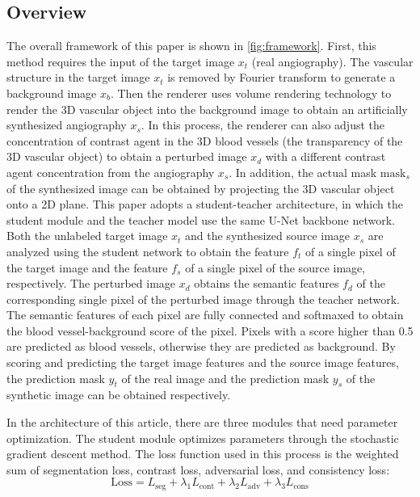 \subsection{Overview}

The overall framework of this paper is shown in \cref{fig:framework}. First, this method requires the input of the target image $x_t$ (real angiography). The vascular structure in the target image $x_t$ is removed by Fourier transform to generate a background image $x_b$. Then the renderer uses volume rendering technology to render the 3D vascular object into the background image to obtain an artificially synthesized angiography $x_s$. In this process, the renderer can also adjust the concentration of contrast agent in the 3D blood vessels (the transparency of the 3D vascular object) to obtain a perturbed image $x_d$ with a different contrast agent concentration from the angiography $x_s$. In addition, the actual mask $\text{mask}_s$ of the synthesized image can be obtained by projecting the 3D vascular object onto a 2D plane. This paper adopts a student-teacher architecture, in which the student module and the teacher model use the same U-Net backbone network. Both the unlabeled target image $x_t$ and the synthesized source image $x_s$ are analyzed using the student network to obtain the feature $f_t$ of a single pixel of the target image and the feature $f_s$ of a single pixel of the source image, respectively. The perturbed image $x_d$ obtains the semantic features $f_d$ of the corresponding single pixel of the perturbed image through the teacher network. The semantic features of each pixel are fully connected and softmaxed to obtain the blood vessel-background score of the pixel. Pixels with a score higher than 0.5 are predicted as blood vessels, otherwise they are predicted as background. By scoring and predicting the target image features and the source image features, the prediction mask $y_t$ of the real image and the prediction mask $y_s$ of the synthetic image can be obtained respectively.

In the architecture of this article, there are three modules that need parameter optimization. The student module optimizes parameters through the stochastic gradient descent method. 
The loss function used in this process is the weighted sum of segmentation loss, contrast loss, adversarial loss, and consistency loss:
\begin{equation}
  \text{Loss} = L_{\text{seg}} + \lambda_1 L_{\text{cont}} + \lambda_2 L_{\text{adv}} + \lambda_3 L_{\text{cons}}
\end{equation}
  
